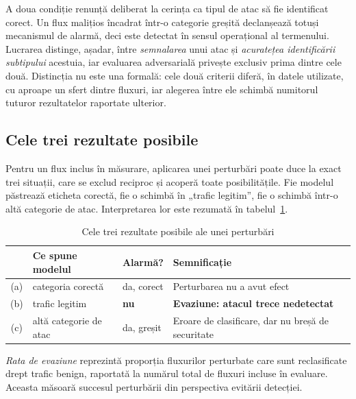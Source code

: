 A doua condiție renunță deliberat la cerința ca tipul de atac să fie identificat corect. Un flux malițios încadrat într-o categorie greșită declanșează totuși mecanismul de alarmă, deci este detectat în sensul operațional al termenului. Lucrarea distinge, așadar, între \emph{semnalarea} unui atac și \emph{acuratețea identificării subtipului} acestuia, iar evaluarea adversarială privește exclusiv prima dintre cele două. Distincția nu este una formală: cele două criterii diferă, în datele utilizate, cu aproape un sfert dintre fluxuri, iar alegerea între ele schimbă numitorul tuturor rezultatelor raportate ulterior.

\subsection{Cele trei rezultate posibile}\label{subsec:rezultate}

Pentru un flux inclus în măsurare, aplicarea unei perturbări poate duce la exact trei situații, care se exclud reciproc și acoperă toate posibilitățile. Fie modelul păstrează eticheta corectă, fie o schimbă în „trafic legitim”, fie o schimbă într-o altă categorie de atac. Interpretarea lor este rezumată în tabelul~\ref{tab:trei}.

\begin{table}[!ht]
    \caption{Cele trei rezultate posibile ale unei perturbări}
    \centering
    \begin{tabular}{|c|l|l|p{4.4cm}|}
        \hline
        & \textbf{Ce spune modelul} & \textbf{Alarmă?} & \textbf{Semnificație} \\
        \hline
        (a) & categoria corectă & da, corect & Perturbarea nu a avut efect \\
        \hline
        (b) & trafic legitim & \textbf{nu} & \textbf{Evaziune: atacul trece nedetectat} \\
        \hline
        (c) & altă categorie de atac & da, greșit & Eroare de clasificare, dar nu breșă de securitate \\
        \hline
    \end{tabular}
    \label{tab:trei}
\end{table}


\vspace{2.0cm}
\emph{Rata de evaziune} reprezintă proporția fluxurilor perturbate care sunt reclasificate drept trafic benign, raportată la numărul total de fluxuri incluse în evaluare. Aceasta măsoară succesul perturbării din perspectiva evitării detecției.

